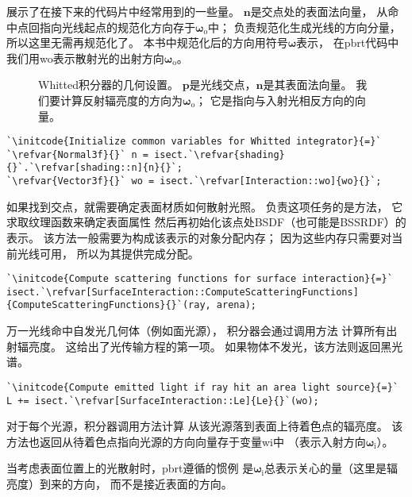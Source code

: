 展示了在接下来的代码片中经常用到的一些量。
$\bm n$是交点处的表面法向量，
从命中点回指向光线起点的规范化方向存于${\bm \omega}_\mathrm{o}$中；
\protect{}负责规范化生成光线的方向分量，
所以这里无需再规范化了。
本书中规范化后的方向用符号$\bm \omega$表示，
在pbrt代码中我们用{\ttfamily wo}表示散射光的出射方向${\bm \omega}_\mathrm{o}$。
\begin{figure}[htbp]
    \centering
    \caption{Whitted积分器的几何设置。
        $\bm p$是光线交点，$\bm n$是其表面法向量。
        我们要计算反射辐亮度的方向为${\bm \omega}_\mathrm{o}$；
        它是指向与入射光相反方向的向量。}
    \label{fig:1.20}
\end{figure}
\begin{lstlisting}
`\initcode{Initialize common variables for Whitted integrator}{=}`
`\refvar{Normal3f}{}` n = isect.`\refvar{shading}{}`.`\refvar[shading::n]{n}{}`;
`\refvar{Vector3f}{}` wo = isect.`\refvar[Interaction::wo]{wo}{}`;
\end{lstlisting}

如果找到交点，就需要确定表面材质如何散射光照。
负责这项任务的是方法，
它求取纹理函数来确定表面属性
然后再初始化该点处BSDF（也可能是BSSRDF）的表示。
该方法一般需要为构成该表示的对象分配内存；
因为这些内存只需要对当前光线可用，
所以为其提供完成分配。
\begin{lstlisting}
`\initcode{Compute scattering functions for surface interaction}{=}`
isect.`\refvar[SurfaceInteraction::ComputeScatteringFunctions]{ComputeScatteringFunctions}{}`(ray, arena);
\end{lstlisting}

万一光线命中自发光几何体（例如面光源），
积分器会通过调用方法
计算所有出射辐亮度。
这给出了光传输方程的第一项。
如果物体不发光，该方法则返回黑光谱。
\begin{lstlisting}
`\initcode{Compute emitted light if ray hit an area light source}{=}`
L += isect.`\refvar[SurfaceInteraction::Le]{Le}{}`(wo);
\end{lstlisting}

对于每个光源，积分器调用方法计算
从该光源落到表面上待着色点的辐亮度。
该方法也返回从待着色点指向光源的方向向量存于变量{\ttfamily wi}中
（表示入射方向${\bm \omega}_\mathrm{i}$）。
\begin{remark}
    当考虑表面位置上的光散射时，pbrt遵循的惯例
    是${\bm \omega}_\mathrm{i}$总表示关心的量（这里是辐亮度）到来的方向，
    而不是接近表面的方向。
\end{remark}


